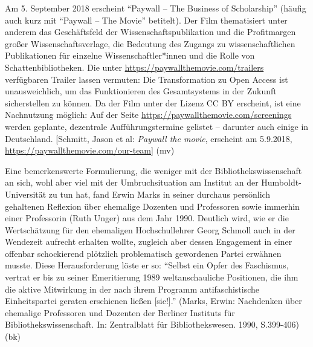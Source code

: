 \documentclass[a4paper,
fontsize=11pt,
oneside,
numbers=noperiodatend,
parskip=half-,
bibliography=totoc,
final
]{scrartcl}
\begin{document}
Am 5. September 2018 erscheint \enquote{Paywall -- The Business of
Scholarship} (häufig auch kurz mit \enquote{Paywall -- The Movie}
betitelt). Der Film thematisiert unter anderem das Geschäftsfeld der
Wissenschaftspublikation und die Profitmargen großer
Wissenschaftsverlage, die Bedeutung des Zugangs zu wissenschaftlichen
Publikationen für einzelne Wissenschaftler*innen und die Rolle von
Schattenbibliotheken. Die unter
\url{https://paywallthemovie.com/trailers} verfügbaren Trailer lassen
vermuten: Die Transformation zu Open Access ist unausweichlich, um das
Funktionieren des Gesamtsystems in der Zukunft sicherstellen zu können.
Da der Film unter der Lizenz CC BY erscheint, ist eine Nachnutzung
möglich: Auf der Seite \url{https://paywallthemovie.com/screenings}
werden geplante, dezentrale Aufführungstermine gelistet -- darunter auch
einige in Deutschland. {[}Schmitt, Jason et al: \emph{Paywall the
movie}, erscheint am 5.9.2018,
\url{https://paywallthemovie.com/our-team}{]} (mv)

Eine bemerkenswerte Formulierung, die weniger mit der
Bibliothekswissenschaft an sich, wohl aber viel mit der Umbruchsituation
am Institut an der Humboldt-Universität zu tun hat, fand Erwin Marks in
seiner durchaus persönlich gehaltenen Reflexion über ehemalige Dozenten
und Professoren sowie immerhin einer Professorin (Ruth Unger) aus dem
Jahr 1990. Deutlich wird, wie er die Wertschätzung für den ehemaligen
Hochschullehrer Georg Schmoll auch in der Wendezeit aufrecht erhalten
wollte, zugleich aber dessen Engagement in einer offenbar schockierend
plötzlich problematisch gewordenen Partei erwähnen musste. Diese
Herausforderung löste er so: \enquote{Selbst ein Opfer des Faschismus,
vertrat er bis zu seiner Emeritierung 1989 weltanschauliche Positionen,
die ihm die aktive Mitwirkung in der nach ihrem Programm
antifaschistische Einheitspartei geraten erschienen ließen {[}sic!{]}.}
(Marks, Erwin: Nachdenken über ehemalige Professoren und Dozenten der
Berliner Instituts für Bibliothekswissenschaft. In: Zentralblatt für
Bibliothekswesen. 1990, S.399-406) (bk)

\end{document}

